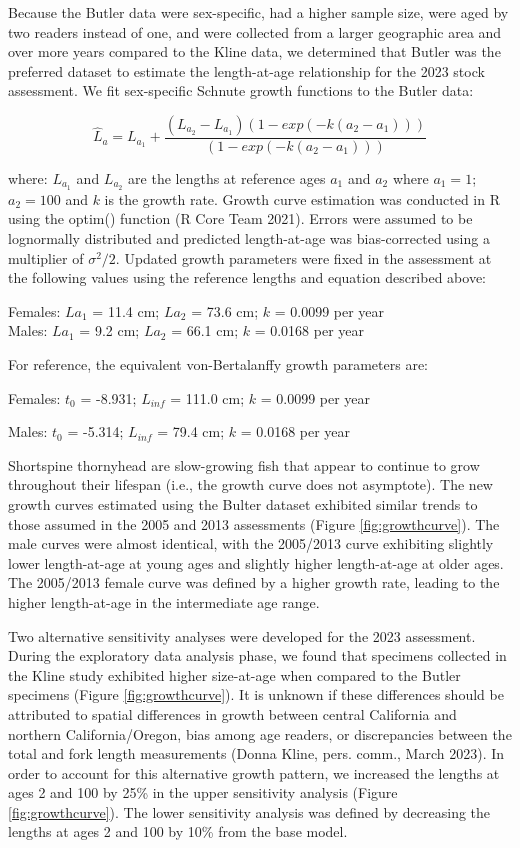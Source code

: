 \documentclass[11pt,
  english,
  letterpaper,
]{article}
\begin{document}
Because the Butler data were sex-specific, had a higher sample size, were aged by two readers instead of one, and were collected from a larger geographic area and over more years compared to the Kline data, we determined that Butler was the preferred dataset to estimate the length-at-age relationship for the 2023 stock assessment. We fit sex-specific Schnute growth functions to the Butler data:

\begin{equation} \hat{L}_{a} = L_{a_{1}}+\frac{(L_{a_{2}}-L_{a_{1}})(1-exp(-k(a_{2}-a_{1})))}{(1-exp(-k(a_{2}-a_{1})))}\end{equation}

where: \(L_{a_{1}}\) and \(L_{a_{2}}\) are the lengths at reference ages \(a_{1}\) and \(a_{2}\) where \(a_{1}=1\); \(a_{2}=100\) and \(k\) is the growth rate. Growth curve estimation was conducted in R using the optim() function (R Core Team 2021). Errors were assumed to be lognormally distributed and predicted length-at-age was bias-corrected using a multiplier of \(\sigma^2/2\). Updated growth parameters were fixed in the assessment at the following values using the reference lengths and equation described above:

Females: \(L{a_{1}}\) = 11.4 cm; \(L{a_{2}}\) = 73.6 cm; \(k\) = 0.0099 per year\\
Males: \(L{a_{1}}\) = 9.2 cm; \(L{a_{2}}\) = 66.1 cm; \(k\) = 0.0168 per year

For reference, the equivalent von-Bertalanffy growth parameters are:

Females: \(t{_0}\) = -8.931; \(L{_{inf}}\) = 111.0 cm; \(k\) = 0.0099 per year

Males: \(t{_0}\) = -5.314; \(L{_{inf}}\) = 79.4 cm; \(k\) = 0.0168 per year

Shortspine thornyhead are slow-growing fish that appear to continue to grow throughout their lifespan (i.e., the growth curve does not asymptote). The new growth curves estimated using the Bulter dataset exhibited similar trends to those assumed in the 2005 and 2013 assessments (Figure \ref{fig:growthcurve}). The male curves were almost identical, with the 2005/2013 curve exhibiting slightly lower length-at-age at young ages and slightly higher length-at-age at older ages. The 2005/2013 female curve was defined by a higher growth rate, leading to the higher length-at-age in the intermediate age range.

Two alternative sensitivity analyses were developed for the 2023 assessment. During the exploratory data analysis phase, we found that specimens collected in the Kline study exhibited higher size-at-age when compared to the Butler specimens (Figure \ref{fig:growthcurve}). It is unknown if these differences should be attributed to spatial differences in growth between central California and northern California/Oregon, bias among age readers, or discrepancies between the total and fork length measurements (Donna Kline, pers. comm., March 2023). In order to account for this alternative growth pattern, we increased the lengths at ages 2 and 100 by 25\% in the upper sensitivity analysis (Figure \ref{fig:growthcurve}). The lower sensitivity analysis was defined by decreasing the lengths at ages 2 and 100 by 10\% from the base model.
\end{document}

